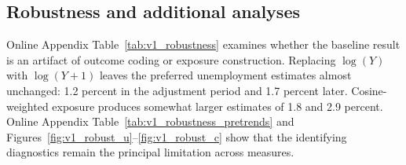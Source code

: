 \documentclass[11pt]{article}
\begin{document}
\subsection{Robustness and additional analyses}
\label{sec:v1_robustness}

Online Appendix Table~\ref{tab:v1_robustness} examines whether the baseline result is an artifact of outcome coding or exposure construction. Replacing \(\log(Y)\) with \(\log(Y+1)\) leaves the preferred unemployment estimates almost unchanged: 1.2 percent in the adjustment period and 1.7 percent later. Cosine-weighted exposure produces somewhat larger estimates of 1.8 and 2.9 percent. %
Online Appendix Table~\ref{tab:v1_robustness_pretrends} and Figures~\ref{fig:v1_robust_u}--\ref{fig:v1_robust_c} show that the identifying diagnostics remain the principal limitation across measures.%

\end{document}
